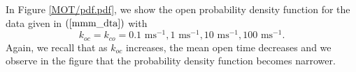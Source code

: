 In Figure \ref{MOT/pdf.pdf}, we show the open probability density function for the data given
in $\left( \ref{mmm_dta}\right)  $ with
\[
k_{oc}=k_{co}=0.1 \text{ ms}^{-1},1\text{ ms}^{-1},10\text{ ms}^{-1},100 \text{ ms}^{-1}.
\]
Again, we recall that as $k_{oc}$ increases, the mean open time
decreases and we observe in the figure that the probability density function
becomes narrower.


\bigskip

\begin{comment}
\subsection{The limit of the zero mean open time}


\end{comment}
